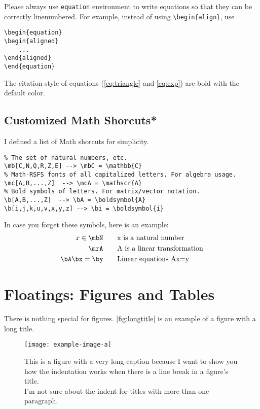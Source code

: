 \documentclass[12pt]{trbart}
\begin{document}
Please always use \texttt{equation} environment to write equations so that they can be correctly linenumbered. For example, instead of using \verb+\begin{align}+, use
\begin{verbatim}
\begin{equation}
\begin{aligned}
    ...
\end{aligned}
\end{equation}
\end{verbatim}

The citation style of equations (\autoref{eq:triangle} and \autoref{eq:exp}) are bold with the default color.

\subsection{Customized Math Shorcuts*}
I defined a list of Math shorcuts for simplicity.
\begin{verbatim}
% The set of natural numbers, etc.
\mb[C,N,Q,R,Z,E] --> \mbC = \mathbb{C}
% Math-RSFS fonts of all capitalized letters. For algebra usage.
\mc[A,B,...,Z]  --> \mcA = \mathscr{A}
% Bold symbols of letters. For matrix/vector notation.
\b[A,B,...,Z]  --> \bA = \boldsymbol{A}
\b[i,j,k,u,v,x,y,z] --> \bi = \boldsymbol{i}
\end{verbatim}

In case you forget these symbols, here is an example:
\begin{equation}
\begin{aligned}
x\in\mbN &\qquad\text{x is a natural number} \\
\mrA &\qquad\text{A is a linear transformation} \\
\bA\bx = \by &\qquad\text{Linear equations Ax=y}
\end{aligned}
\end{equation}


\section{Floatings: Figures and Tables}
There is nothing special for figures. \autoref{fig:longtitle} is an example of a figure with a long title.
\begin{figure}[!hbt]
    \centering
    \texttt{[image: example-image-a]}
    \caption{This is a figure with a very long caption because I want to show you how the indentation works when there is a line break in a figure's title.\\ I'm not sure about the indent for titles with more than one paragraph.}\label{fig:longtitle}
\end{figure}
\end{document}
